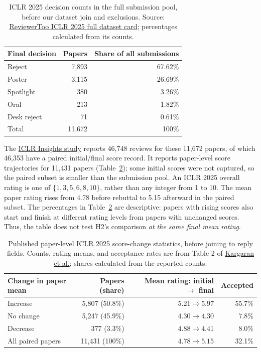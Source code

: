 \documentclass[11pt]{article}
\begin{document}
\begin{table}[htbp]
\centering
\small
\begin{tabular}{lrr}
\toprule
Final decision & Papers & Share of all submissions \\
\midrule
Reject & 7,893 & 67.62\% \\
Poster & 3,115 & 26.69\% \\
Spotlight & 380 & 3.26\% \\
Oral & 213 & 1.82\% \\
Desk reject & 71 & 0.61\% \\
\midrule
Total & 11,672 & 100\% \\
\bottomrule
\end{tabular}
\caption{ICLR 2025 decision counts in the full submission pool, before our dataset join and exclusions. Source: \href{https://huggingface.co/datasets/demfier/reviewertoo-iclr2025}{ReviewerToo ICLR 2025 full dataset card}; percentages calculated from its counts.}
\label{tab:decisions}
\end{table}

The \href{https://arxiv.org/pdf/2511.15462}{ICLR Insights study} reports 46,748 reviews for these 11,672 papers, of which 46,353 have a paired initial/final score record. It reports paper-level score trajectories for 11,431 papers (Table~\ref{tab:scores}); some initial scores were not captured, so the paired subset is smaller than the submission pool. An ICLR 2025 overall rating is one of $\{1,3,5,6,8,10\}$, rather than any integer from 1 to 10. The mean paper rating rises from 4.78 before rebuttal to 5.15 afterward in the paired subset. The percentages in Table~\ref{tab:scores} are descriptive: papers with rising scores also start and finish at different rating levels from papers with unchanged scores. Thus, the table does not test H2's comparison \emph{at the same final mean rating}.

\begin{table}[htbp]
\centering
\small
\begin{tabular}{lrrr}
\toprule
Change in paper mean & Papers (share) & Mean rating: initial $\to$ final & Accepted \\
\midrule
Increase & 5,807 (50.8\%) & $5.21\to5.97$ & 55.7\% \\
No change & 5,247 (45.9\%) & $4.30\to4.30$ & 7.8\% \\
Decrease & 377 (3.3\%) & $4.88\to4.41$ & 8.0\% \\
\midrule
All paired papers & 11,431 (100\%) & $4.78\to5.15$ & 32.1\% \\
\bottomrule
\end{tabular}
\caption{Published paper-level ICLR 2025 score-change statistics, before joining to reply fields. Counts, rating means, and acceptance rates are from Table 2 of \href{https://arxiv.org/pdf/2511.15462}{Kargaran et al.}; shares calculated from the reported counts.}
\label{tab:scores}
\end{table}
\end{document}

